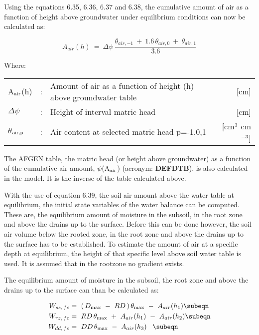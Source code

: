 Using the equations 6.35, 6.36, 6.37 and 6.38, the cumulative amount of air as a function
of height above groundwater under equilibri\-um conditions can now be calculated as: 

\begin{equation}
A_{air} (h) ~=~\Delta  \psi \,{\frac{ \theta_{air, -1} ~+~ 1.6\, \theta_{air,0} ~+~ \theta_{air,1} }{3.6}}
\end{equation}

Where:\\[5pt]
\begin{tabularx}{\textwidth}{llXr}
A$_{{\rm air}}$(h) &:& Amount of air as a function of height (h) above
   groundwater table   & [cm]\\
$\Delta$$\psi$ &:& Height of interval matric head  & [cm]\\
$\theta$$_{{\rm air,p}}$ &:& Air content at selected matric head 
   p=-1,0,1  & [cm$^{{\rm 3}}$ cm$^{{\rm -3}}$]
\end{tabularx}

The AFGEN table, the matric head (or height above groundwater) as a function of the
cumulative air amount, $\psi$(A$_{{\rm air}}$) (acronym: {\bf DEFDTB}), is also calculated in the model. It is
the inverse of the table calculated above.

With the use of equation 6.39, the soil air amount above the water table at equilibrium,
the initial state variables of the water balance can be computed. These are, the equilibri\-um amount of moisture in the subsoil, in the root zone and above the drains up to the
surface. Before this can be done however, the soil air volume below the rooted zone, in
the root zone and above the drains up to the surface has to be established. To estimate the
amount of air at a specific depth at equilibrium, the height of that specific level above soil
water table is used. It is assumed that in the rootzone no gradient exists. 

The equilibrium amount of moisture in the subsoil, the root zone and above the drains up
to the surface can than be calculated as:

\begin{align}
W_{ss,\, fc} &=~ (\, D_{\max} ~-~ RD\, )\, \theta_{\max } ~-~ A_{air} (h_{1} )
    \subeqn  \\
W_{rz,\, fc} &=~ RD\, \theta_{\max } ~+~A_{air} (h_{1} )~-~A_{air} (h_{2} ) 
   \subeqn  \\
W_{dd,\, fc} &=~ DD\, \theta_{\max } ~-~A _{air} (h_{3} )~~\, 
   \subeqn
\end{align}

